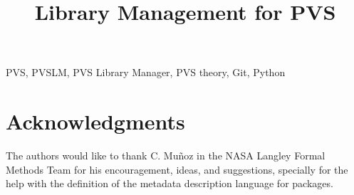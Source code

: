 \documentclass[journal,comsoc]{IEEEtran}
\begin{document}

\title{Library Management for PVS}


\author{
}

\maketitle



\begin{IEEEkeywords}
PVS, PVSLM, PVS Library Manager, PVS theory, Git, Python
\end{IEEEkeywords}

\IEEEpeerreviewmaketitle













\section*{Acknowledgments}
The authors would like to thank
C. Mu\~noz in the NASA Langley Formal Methods Team for his
encouragement, ideas, and suggestions, specially for the help with the
definition of the metadata description language for packages.

\ifCLASSOPTIONcaptionsoff
  \newpage
\fi



\end{document}
